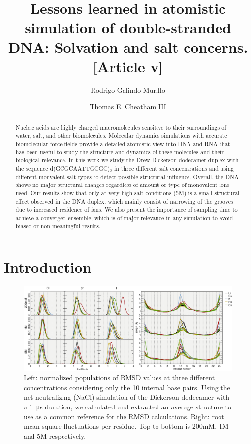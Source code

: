 \documentclass[9pt,lessons]{livecoms}
\title{Lessons learned in atomistic simulation of double-stranded DNA: Solvation and salt concerns. [Article v\versionnumber]}
\author[1]{Rodrigo Galindo-Murillo}
\author[1*]{Thomas E. Cheatham III}
\affil[1]{Department of Medicinal Chemistry, L. S. Skaggs Pharmacy Institute, University of Utah, Salt Lake City, UT 84112}
\begin{document}
\begin{frontmatter}
\maketitle

\begin{abstract}
Nucleic acids are highly charged macromolecules sensitive to their
surroundings of water, salt, and other biomolecules. Molecular
dynamics simulations with accurate biomolecular force fields provide a
detailed atomistic view into DNA and RNA that has been useful to study
the structure and dynamics of these molecules and their biological
relevance. In this work we study the Drew-Dickerson dodecamer duplex
with the sequence d(GCGCAATTGCGC)$_{2}$ in three different
salt concentrations and using different monvalent salt types to detect
possible structural influence. Overall, the DNA shows no major
structural changes regardless of amount or type of monovalent ions used. Our
results show that only at very high salt conditions (5M) is a small
structural effect observed in the DNA duplex, which mainly consist of
narrowing of the grooves due to increased residence of ions. We
also present the importance of sampling time to achieve a converged
ensemble, which is of major relevance in any simulation to avoid
biased or non-meaningful results.
\end{abstract}

\end{frontmatter}


\section{Introduction}

\begin{figure}[h]
\centering
\includegraphics[width=\linewidth]{1us-rms-ALL-inner-avg_ref-bsc0}
\caption{Left: normalized populations of RMSD values at three different concentrations considering only the 10 internal base pairs. Using the net-neutralizing (NaCl) simulation of the Dickerson dodecamer with a
  \SI{1}{\micro\second} duration, we calculated and extracted an average structure to use as a common reference for the RMSD calculations. Right: root mean square fluctuations per residue. Top to
  bottom is 200mM, 1M and 5M respectively.}
\label{1us-rms-ALL-inner-avg_ref-bsc0}
\end{figure}
\end{document}
